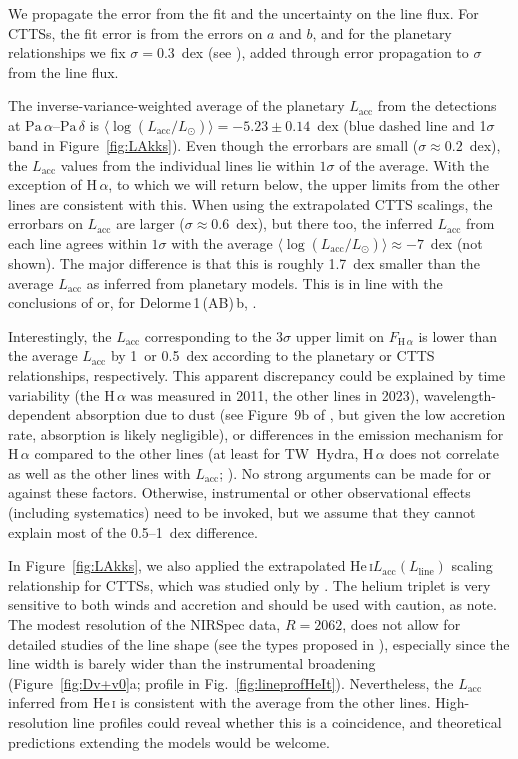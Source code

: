 \documentclass[twocolumn,twocolumnappendix]{aastex631}
\newcommand{\neuI}[1]{{\leavevmode{\boldmath\bfseries#1}}}
\renewcommand{\neuI}[1]{{\leavevmode#1}}
\def\LSonne{\ensuremath{L_\odot}\xspace}           %
\def\Ha{\ensuremath{\mathrm{H}\,\alpha}\xspace}             %
\def\Paa{\ensuremath{\mathrm{Pa}\,\alpha}\xspace}           %
\def\Pad{\ensuremath{\mathrm{Pa}\,\delta}\xspace}           %
\def\HeI{\ensuremath{\mathrm{He}}\,\textsc{i}\xspace}       %
\def\HeIt{\HeI}                     %
\def\Dlrmb{Delorme\,1\,(AB)\,b\xspace}                      %
\newcommand{\Lacc}{\ensuremath{{L_{\textrm{acc}}}}\xspace}  %
\def\LAkk{\Lacc}
\def\FHa{\ensuremath{F_{\textrm{H}\,\alpha}}\xspace}             %
\def\LLinie{\ensuremath{L_{\textrm{line}}}\xspace}                      %
\begin{document}
We propagate the error from the fit and the uncertainty on the line flux.
For CTTSs, the fit error is from the errors on $a$ and $b$,
and for the planetary relationships we fix $\sigma=0.3$~dex (see \citealp{AMIM21L}),
added through error propagation to $\sigma$ from the line flux.
%



The inverse-variance-weighted average of the planetary \LAkk from 
%
%
%
the detections at \Paa--\Pad is $\langle\log(\LAkk/\LSonne)\rangle=-5.23\pm0.14$~dex (blue dashed line and 1$\sigma$ band in Figure~\ref{fig:LAkks}).
Even though the errorbars are small ($\sigma\approx0.2$~dex), the \LAkk values from the individual lines lie within $1\sigma$ of the average.
With the exception of \Ha, to which we will return below, the upper limits from the other lines are consistent with this.
When using the extrapolated CTTS scalings, the errorbars on \LAkk are larger ($\sigma\approx0.6$~dex), but there too, the inferred \LAkk from each line agrees within $1\sigma$ with the average $\langle\log(\LAkk/\LSonne)\rangle\approx-7$~dex (not shown). The major difference is that this is roughly 1.7~dex smaller than the average \LAkk as inferred from planetary models. This is in line with the conclusions of \citet{AMIM21L} or, for \Dlrmb, \citet{betti22b,betti22c}.

Interestingly, the \LAkk corresponding to the $3\sigma$ upper limit on \FHa is lower than the average \LAkk by 1~or 0.5~dex according to the planetary or CTTS relationships, respectively. This apparent discrepancy could be explained by time variability (the \Ha was measured in 2011, the other lines in 2023),
wavelength-dependent absorption due to dust (see Figure~9b of \citealt{maea21}, but given the low accretion rate, \neuI{absorption} is likely \neuI{negligible}), or differences in the emission mechanism for \Ha compared to the other lines (at least for TW~Hydra, \Ha does not correlate as well as the other lines with \Lacc; \citealp{herczeg23}). No strong arguments can be made for or against these factors. Otherwise, instrumental or other observational effects (including systematics) need to be invoked, but we assume that they cannot explain most of the 0.5--1~dex difference.
%


In Figure~\ref{fig:LAkks}, we also applied the extrapolated \HeIt $\LAkk(\LLinie)$ scaling relationship for CTTSs, which was studied only by \citet{alcal14}.
The helium triplet is very sensitive to both winds and accretion \citep[e.g.,][]{fischer08,thanathibodee22,erkal22} and should be used with caution, as \citet{alcal14} note.  %
The modest resolution of the NIRSpec data, $R=2062$, does not allow for detailed studies of the line shape (see the types proposed in \citealt{thanathibodee22}), especially since the line width is barely wider than the instrumental broadening (Figure~\ref{fig:Dv+v0}a; profile in Fig.~\ref{fig:lineprofHeIt}). Nevertheless, the \LAkk inferred from \HeIt is consistent with the average from the other lines. High-resolution line profiles could reveal whether this is a coincidence, and theoretical predictions extending the \citet{aoyama18} models would be welcome.
\end{document}
